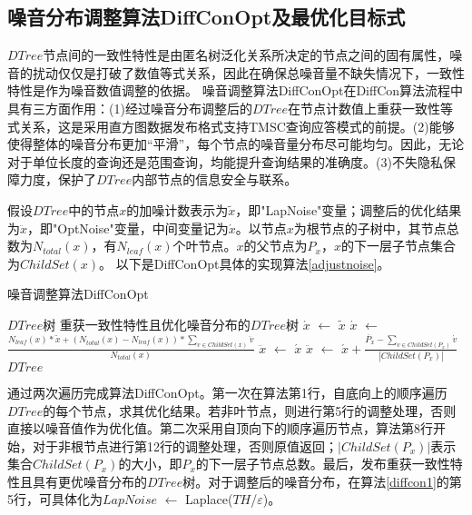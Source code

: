 

\subsection{噪音分布调整算法DiffConOpt及最优化目标式}

$DTree$节点间的一致性特性是由匿名树泛化关系所决定的节点之间的固有属性，噪音的扰动仅仅是打破了数值等式关系，因此在确保总噪音量不缺失情况下，一致性特性是作为噪音数值调整的依据。
噪音调整算法DiffConOpt在DiffCon算法流程中具有三方面作用：(1)经过噪音分布调整后的$DTree$在节点计数值上重获一致性等式关系，这是采用直方图数据发布格式支持TMSC查询应答模式的前提。(2)能够使得整体的噪音分布更加“平滑”，每个节点的噪音量分布尽可能均匀。因此，无论对于单位长度的查询还是范围查询，均能提升查询结果的准确度。(3)不失隐私保障力度，保护了$DTree$内部节点的信息安全与联系。

假设$DTree$中的节点$x$的加噪计数表示为$\tilde{x}$，即"LapNoise"变量；调整后的优化结果为$\ddot{x}$，即"OptNoise"变量，中间变量记为$\acute{x}$。以节点$x$为根节点的子树中，其节点总数为$N_{total}(x)$，有$N_{leaf}(x)$个叶节点。$x$的父节点为$P_{x}$，$x$的下一层子节点集合为$ChildSet(x)$。
以下是DiffConOpt具体的实现算法\ref{adjustnoise}。

\begin{algorithm}[H]
	\caption{噪音调整算法DiffConOpt} 
	\label{adjustnoise}
	\begin{algorithmic}[1]
		\REQUIRE $DTree$树
		\ENSURE 重获一致性特性且优化噪音分布的$DTree$树
		\STATE $\acute{x}$ $\leftarrow$ $\tilde{x}$ 
		\ELSE
		\STATE  $\acute{x}$ $\leftarrow$ $\frac{{N_{leaf}(x) * \tilde{x} + (N_{total}(x) - N_{leaf}(x)) * \sum\nolimits_{v \in ChildSet(x)} {\ddot{v}}}}{{N_{total}(x)}}$
		\ENDIF
		\ENDFOR
		\STATE  $\ddot{x}$ $\leftarrow$ $\acute{x}$
		\ELSE
		\STATE  $\ddot{x}$ $\leftarrow$ $\acute{x} + \frac{{\ddot{P_{x}} - \sum\nolimits_{v \in ChildSet(P_{x})} {\acute{v}}}}{|ChildSet(P_{x})|}$
		\ENDIF
		\ENDFOR
		\RETURN $DTree$
	\end{algorithmic}
\end{algorithm}

通过两次遍历完成算法DiffConOpt。第一次在算法第1行，自底向上的顺序遍历$DTree$的每个节点，求其优化结果。若非叶节点，则进行第5行的调整处理，否则直接以噪音值作为优化值。第二次采用自顶向下的顺序遍历节点，算法第8行开始，对于非根节点进行第12行的调整处理，否则原值返回；$|ChildSet(P_{x})|$表示集合$ChildSet(P_{x})$的大小，即$P_{x}$的下一层子节点总数。最后，发布重获一致性特性且具有更优噪音分布的$DTree$树。对于调整后的噪音分布，在算法\ref{diffcon1}的第5行，可具体化为$LapNoise$ $\leftarrow$ Laplace($TH$/$\varepsilon$)。


